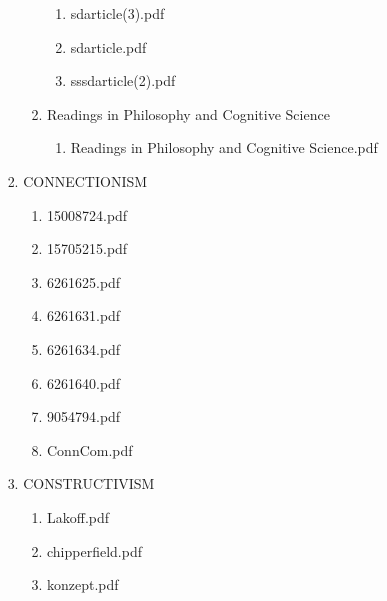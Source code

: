 \documentclass[11pt]{article}
\begin{document}
\begin{enumerate}
\begin{enumerate}
\begin{enumerate}
\begin{enumerate}
\begin{enumerate}
\begin{enumerate}
\item sdarticle(3).pdf
\label{sec-1-1-1-1-7-3-18-8-3}

\item sdarticle.pdf
\label{sec-1-1-1-1-7-3-18-8-4}

\item sssdarticle(2).pdf
\label{sec-1-1-1-1-7-3-18-8-5}
\end{enumerate}

\item Readings in Philosophy and Cognitive Science
\label{sec-1-1-1-1-7-3-18-9}
\begin{enumerate}
\item Readings in Philosophy and Cognitive Science.pdf
\label{sec-1-1-1-1-7-3-18-9-1}
\end{enumerate}
\end{enumerate}

\item CONNECTIONISM
\label{sec-1-1-1-1-7-3-19}
\begin{enumerate}
\item 15008724.pdf
\label{sec-1-1-1-1-7-3-19-1}

\item 15705215.pdf
\label{sec-1-1-1-1-7-3-19-2}

\item 6261625.pdf
\label{sec-1-1-1-1-7-3-19-3}

\item 6261631.pdf
\label{sec-1-1-1-1-7-3-19-4}

\item 6261634.pdf
\label{sec-1-1-1-1-7-3-19-5}

\item 6261640.pdf
\label{sec-1-1-1-1-7-3-19-6}

\item 9054794.pdf
\label{sec-1-1-1-1-7-3-19-7}

\item ConnCom.pdf
\label{sec-1-1-1-1-7-3-19-8}
\end{enumerate}

\item CONSTRUCTIVISM
\label{sec-1-1-1-1-7-3-20}
\begin{enumerate}
\item Lakoff.pdf
\label{sec-1-1-1-1-7-3-20-1}

\item chipperfield.pdf
\label{sec-1-1-1-1-7-3-20-2}

\item konzept.pdf
\label{sec-1-1-1-1-7-3-20-3}


\end{enumerate}
\end{enumerate}
\end{enumerate}
\end{enumerate}
\end{enumerate}
\end{document}
